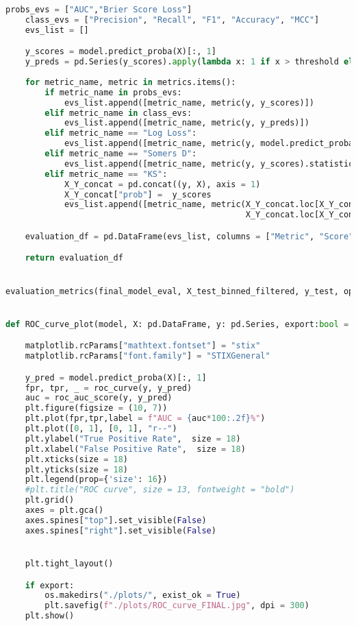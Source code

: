 \begin{lstlisting}[language=Python, basicstyle=\footnotesize\ttfamily]
    probs_evs = ["AUC","Brier Score Loss"]
    class_evs = ["Precision", "Recall", "F1", "Accuracy", "MCC"]
    evs_list = []

    y_scores = model.predict_proba(X)[:, 1]
    y_preds = pd.Series(y_scores).apply(lambda x: 1 if x > threshold else 0)
    
    for metric_name, metric in metrics.items():
        if metric_name in probs_evs:
            evs_list.append([metric_name, metric(y, y_scores)])
        elif metric_name in class_evs:
            evs_list.append([metric_name, metric(y, y_preds)])
        elif metric_name == "Log Loss":
            evs_list.append([metric_name, metric(y, model.predict_proba(X))])
        elif metric_name == "Somers D":
            evs_list.append([metric_name, metric(y, y_scores).statistic])
        elif metric_name == "KS":
            X_Y_concat = pd.concat((y, X), axis = 1)
            X_Y_concat["prob"] =  y_scores
            evs_list.append([metric_name, metric(X_Y_concat.loc[X_Y_concat[target] == 1, "prob"],
                                                 X_Y_concat.loc[X_Y_concat[target] == 0, "prob"]).statistic])

    evaluation_df = pd.DataFrame(evs_list, columns = ["Metric", "Score"])

    return evaluation_df


evaluation_metrics(final_model_eval, X_test_binned_filtered, y_test, opt_threshold)


def ROC_curve_plot(model, X: pd.DataFrame, y: pd.Series, export:bool = True):

    matplotlib.rcParams["mathtext.fontset"] = "stix"
    matplotlib.rcParams["font.family"] = "STIXGeneral"

    y_pred = model.predict_proba(X)[:, 1]
    fpr, tpr, _ = roc_curve(y, y_pred)
    auc = roc_auc_score(y, y_pred)
    plt.figure(figsize = (10, 7))
    plt.plot(fpr,tpr,label = f"AUC = {auc*100:.2f}%")
    plt.plot([0, 1], [0, 1], "r--")
    plt.ylabel("True Positive Rate",  size = 18)
    plt.xlabel("False Positive Rate",  size = 18)
    plt.xticks(size = 18)
    plt.yticks(size = 18)
    plt.legend(prop={'size': 16})
    #plt.title("ROC curve", size = 13, fontweight = "bold")
    plt.grid()
    axes = plt.gca()
    axes.spines["top"].set_visible(False)
    axes.spines["right"].set_visible(False)


    plt.tight_layout()

    if export:
        os.makedirs("./plots/", exist_ok = True)
        plt.savefig(f"./plots/ROC_curve_FINAL.jpg", dpi = 300)
    plt.show()



\end{lstlisting}
